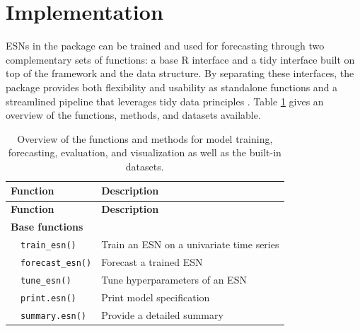 \section{Implementation}\label{implementation}

ESNs in the  package can be trained and used for forecasting through two complementary sets of functions: a base R interface and a tidy interface built on top of the  framework and the  data structure. By separating these interfaces, the package provides both flexibility and usability as standalone functions and a streamlined pipeline that leverages tidy data principles \citep{tidyverse}. Table \ref{tab:functions} gives an overview of the functions, methods, and datasets available.

\begin{longtable}[]{@{}
  >{\raggedright\arraybackslash}p{}
  >{\raggedright\arraybackslash}p{}@{}}
\caption{\label{tab:functions} Overview of the functions and methods for model training, forecasting, evaluation, and visualization as well as the built-in datasets.}\tabularnewline
\toprule\noalign{}
\begin{minipage}[b]{\linewidth}\raggedright
\textbf{Function}
\end{minipage} & \begin{minipage}[b]{\linewidth}\raggedright
\textbf{Description}
\end{minipage} \\
\midrule\noalign{}
\endfirsthead
\toprule\noalign{}
\begin{minipage}[b]{\linewidth}\raggedright
\textbf{Function}
\end{minipage} & \begin{minipage}[b]{\linewidth}\raggedright
\textbf{Description}
\end{minipage} \\
\midrule\noalign{}
\endhead
\bottomrule\noalign{}
\endlastfoot
\textbf{Base functions} & \\
\(~~~\) \texttt{train\_esn()} & Train an ESN on a univariate time series \\
\(~~~\) \texttt{forecast\_esn()} & Forecast a trained ESN \\
\(~~~\) \texttt{tune\_esn()} & Tune hyperparameters of an ESN \\
\(~~~\) \texttt{print.esn()} & Print model specification \\
\(~~~\) \texttt{summary.esn()} & Provide a detailed summary \\

\end{longtable}
